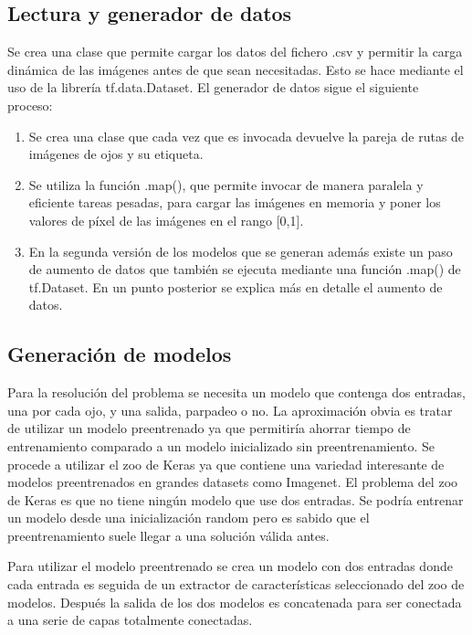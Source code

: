 \documentclass[12pt]{article}
\begin{document}
    \subsection*{Lectura y generador de datos}
    Se crea una clase que permite cargar los datos del fichero .csv y permitir la carga dinámica de las
    imágenes antes de que sean necesitadas.
    Esto se hace mediante el uso de la librería tf.data.Dataset\cite{tfdata_dataset}.
    El generador de datos sigue el siguiente proceso:
    \begin{enumerate}
        \item Se crea una clase que cada vez que es invocada devuelve la pareja de rutas de imágenes de ojos y su
        etiqueta.
        \item Se utiliza la función .map(), que permite invocar de manera paralela y eficiente tareas pesadas, para
        cargar las imágenes en memoria y poner los valores de píxel de las imágenes en el rango [0,1].
        \item En la segunda versión de los modelos que se generan además existe un paso de aumento de datos que
        también se ejecuta mediante una función .map() de tf.Dataset.
        En un punto posterior se explica más en detalle el aumento de datos.
    \end{enumerate}

    \subsection*{Generación de modelos}
    Para la resolución del problema se necesita un modelo que contenga dos entradas, una por cada ojo, y una salida,
    parpadeo o no.
    La aproximación obvia es tratar de utilizar un modelo preentrenado ya que permitiría ahorrar tiempo de
    entrenamiento comparado a un modelo inicializado sin preentrenamiento.
    Se procede a utilizar el zoo de Keras\cite{keras_applications}    ya que contiene una variedad interesante de
    modelos preentrenados en grandes datasets como Imagenet.
    El problema del zoo de Keras es que no tiene ningún modelo que use dos entradas.
    Se podría entrenar un modelo desde una inicialización random pero es sabido que el preentrenamiento suele llegar
    a una solución válida antes.

    Para utilizar el modelo preentrenado se crea un modelo con dos entradas donde cada entrada es seguida de un
    extractor de características seleccionado del zoo de modelos.
    Después la salida de los dos modelos es concatenada para ser conectada a una serie de capas totalmente conectadas.
\end{document}
